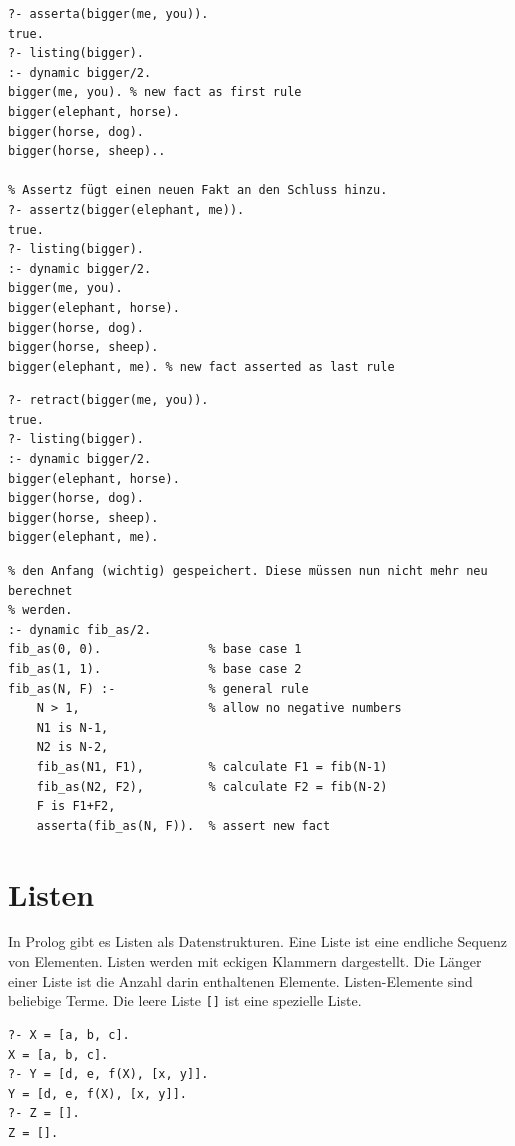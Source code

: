 \begin{lstlisting}[caption=asserta/1 \& assertz/1]
% Asserta fügt einen neuen Fakt an den Beginn hinzu.
?- asserta(bigger(me, you)).
true.
?- listing(bigger).
:- dynamic bigger/2.
bigger(me, you). % new fact as first rule
bigger(elephant, horse).
bigger(horse, dog).
bigger(horse, sheep)..

% Assertz fügt einen neuen Fakt an den Schluss hinzu.
?- assertz(bigger(elephant, me)).
true.
?- listing(bigger).
:- dynamic bigger/2.
bigger(me, you).
bigger(elephant, horse).
bigger(horse, dog).
bigger(horse, sheep).
bigger(elephant, me). % new fact asserted as last rule
\end{lstlisting}

\begin{lstlisting}[caption=retract/1]
% Mittels retract können Fakten/Regeln entfernt werden.
?- retract(bigger(me, you)).
true.
?- listing(bigger).
:- dynamic bigger/2.
bigger(elephant, horse).
bigger(horse, dog).
bigger(horse, sheep).
bigger(elephant, me).
\end{lstlisting}

\newpage

\begin{lstlisting}[caption=Naive Fibonnaci optimiert mit Assertions]
% Nach jeder Berechnung einer Fibonacci Zahl wird diese in die Wissensdatenbank an 
% den Anfang (wichtig) gespeichert. Diese müssen nun nicht mehr neu berechnet 
% werden.
:- dynamic fib_as/2.
fib_as(0, 0). 				% base case 1
fib_as(1, 1). 				% base case 2
fib_as(N, F) :- 			% general rule
	N > 1, 					% allow no negative numbers
	N1 is N-1, 
	N2 is N-2,
	fib_as(N1, F1), 		% calculate F1 = fib(N-1)
	fib_as(N2, F2), 		% calculate F2 = fib(N-2)
	F is F1+F2,
	asserta(fib_as(N, F)). 	% assert new fact
\end{lstlisting}

\section{Listen}
In Prolog gibt es Listen als Datenstrukturen. Eine Liste ist eine endliche Sequenz von Elementen. Listen werden mit eckigen Klammern dargestellt. Die Länger einer Liste ist die Anzahl darin enthaltenen Elemente. Listen-Elemente sind beliebige Terme. Die leere Liste \verb|[]| ist eine spezielle Liste.

\begin{lstlisting}[caption=Listen in Prolog]
?- X = [a, b, c].
X = [a, b, c].
?- Y = [d, e, f(X), [x, y]].
Y = [d, e, f(X), [x, y]].
?- Z = [].
Z = [].
\end{lstlisting}

